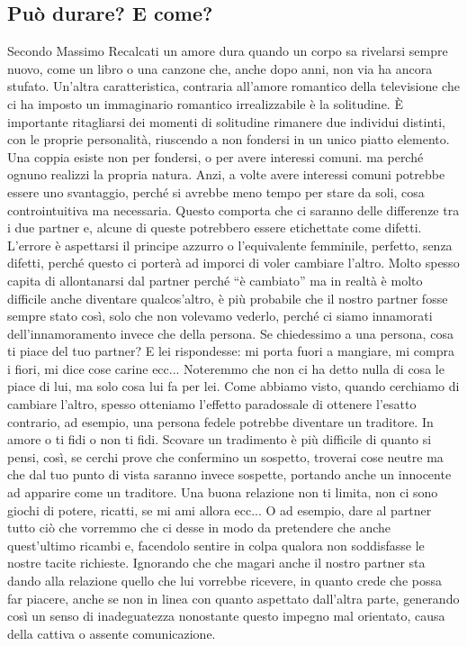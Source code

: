 \documentclass[12pt]{book} %
\begin{document}
\subsection{Può durare? E come?}
Secondo Massimo Recalcati un amore dura quando un corpo sa rivelarsi sempre nuovo, come un libro o una canzone che,
anche dopo anni, non via ha ancora stufato. Un'altra caratteristica, contraria
all'amore romantico della televisione che ci ha imposto un immaginario romantico irrealizzabile è
la solitudine. È importante ritagliarsi dei momenti di solitudine rimanere due individui distinti, con le proprie
personalità, riuscendo a non fondersi in un unico piatto elemento. Una coppia esiste non per fondersi, o per avere
interessi comuni. ma perché ognuno realizzi la propria natura. Anzi, a volte avere interessi comuni potrebbe essere uno
svantaggio, perché si avrebbe meno tempo per stare da soli, cosa controintuitiva ma necessaria. Questo comporta che ci
saranno delle differenze tra i due partner e, alcune di queste potrebbero essere etichettate come difetti.
L'errore è aspettarsi il principe azzurro o l'equivalente femminile,
perfetto, senza difetti, perché questo ci porterà ad imporci di voler cambiare l'altro. Molto
spesso capita di allontanarsi dal partner perché “è cambiato” ma in realtà è molto difficile anche diventare
qualcos'altro, è più probabile che il nostro partner fosse sempre stato così, solo che non
volevamo vederlo, perché ci siamo innamorati dell'innamoramento invece che della persona. Se
chiedessimo a una persona, cosa ti piace del tuo partner? E lei rispondesse: mi porta fuori a mangiare, mi compra i
fiori, mi dice cose carine ecc... Noteremmo che non ci ha detto nulla di cosa le piace di lui, ma solo cosa lui fa per
lei. Come abbiamo visto, quando cerchiamo di cambiare l'altro, spesso otteniamo
l'effetto paradossale di ottenere l'esatto contrario, ad esempio, una persona
fedele potrebbe diventare un traditore. In amore o ti fidi o non ti fidi. Scovare un tradimento è più difficile di
quanto si pensi, così, se cerchi prove che confermino un sospetto, troverai cose neutre ma che dal tuo punto di vista
saranno invece sospette, portando anche un innocente ad apparire come un traditore. Una buona relazione non ti limita,
non ci sono giochi di potere, ricatti, se mi ami allora ecc... O ad esempio, dare al partner tutto ciò che vorremmo che
ci desse in modo da pretendere che anche quest'ultimo ricambi e, facendolo sentire in colpa
qualora non soddisfasse le nostre tacite richieste. Ignorando che che magari anche il nostro partner sta dando alla
relazione quello che lui vorrebbe ricevere, in quanto crede che possa far piacere, anche se non in linea con quanto
aspettato dall'altra parte, generando così un senso di inadeguatezza nonostante questo impegno mal
orientato, causa della cattiva o assente comunicazione.
\end{document}
